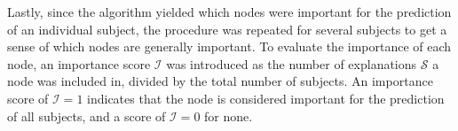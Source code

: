 Lastly, since the algorithm yielded which nodes were important for the prediction of an individual subject, the procedure was repeated for several subjects to get a sense of which nodes are generally important. To evaluate the importance of each node, an importance score $\mathcal{I}$ was introduced as the number of explanations $\mathcal{S}$ a node was included in, divided by the total number of subjects. An importance score of $\mathcal{I}=1$ indicates that the node is considered important for the prediction of all subjects, and a score of $\mathcal{I}=0$ for none.  